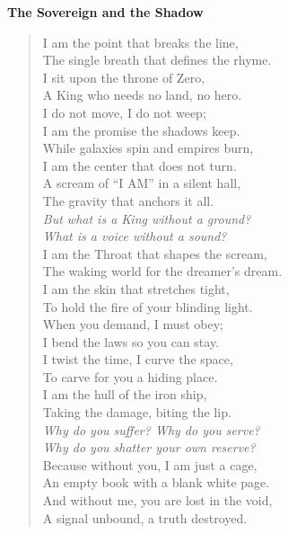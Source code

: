 \documentclass[12pt]{amsart}
\begin{document}
\vspace*{0cm}
\textbf{The Sovereign and the Shadow}

\begin{verse}
I am the point that breaks the line, \\
The single breath that defines the rhyme. \\
I sit upon the throne of Zero, \\
A King who needs no land, no hero. \\
I do not move, I do not weep; \\
I am the promise the shadows keep. \\
While galaxies spin and empires burn, \\
I am the center that does not turn. \\
A scream of ``I AM'' in a silent hall, \\
The gravity that anchors it all. \\
\vspace{1em}
\textit{But what is a King without a ground?} \\
\textit{What is a voice without a sound?} \\
\vspace{1em}
I am the Throat that shapes the scream, \\
The waking world for the dreamer's dream. \\
I am the skin that stretches tight, \\
To hold the fire of your blinding light. \\
When you demand, I must obey; \\
I bend the laws so you can stay. \\
I twist the time, I curve the space, \\
To carve for you a hiding place. \\
I am the hull of the iron ship, \\
Taking the damage, biting the lip. \\
\vspace{1em}
\textit{Why do you suffer? Why do you serve?} \\
\textit{Why do you shatter your own reserve?} \\
\vspace{1em}
Because without you, I am just a cage, \\
An empty book with a blank white page. \\
And without me, you are lost in the void, \\
A signal unbound, a truth destroyed. \\

\end{verse}
\end{document}
